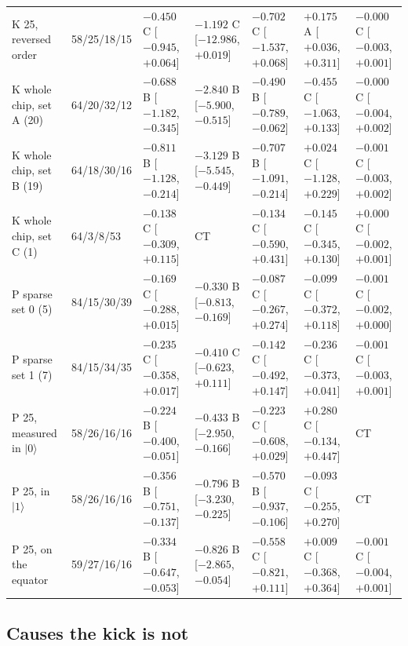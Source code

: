 \documentclass[reprint,amsmath,amssymb,aps,superscriptaddress,nofootinbib]{revtex4-2}
\begin{document}
\begin{table}[!tp]
\begin{tabular}{p{3.6cm}p{1.6cm}p{2.15cm}p{2.15cm}p{2.15cm}p{2.15cm}p{2.15cm}}
K 25, reversed order & 58/25/18/15 & $-0.450$ C [$-0.945$,$+0.064$] & $-1.192$ C [$-12.986$,$+0.019$] & $-0.702$ C [$-1.537$,$+0.068$] & $+0.175$ A [$+0.036$,$+0.311$] & $-0.000$ C [$-0.003$,$+0.001$] \\
K whole chip, set A (20) & 64/20/32/12 & $-0.688$ B [$-1.182$,$-0.345$] & $-2.840$ B [$-5.900$,$-0.515$] & $-0.490$ B [$-0.789$,$-0.062$] & $-0.455$ C [$-1.063$,$+0.133$] & $-0.000$ C [$-0.004$,$+0.002$] \\
K whole chip, set B (19) & 64/18/30/16 & $-0.811$ B [$-1.128$,$-0.214$] & $-3.129$ B [$-5.545$,$-0.449$] & $-0.707$ B [$-1.091$,$-0.214$] & $+0.024$ C [$-1.128$,$+0.229$] & $-0.001$ C [$-0.003$,$+0.002$] \\
K whole chip, set C (1) & 64/3/8/53 & $-0.138$ C [$-0.309$,$+0.115$] & CT & $-0.134$ C [$-0.590$,$+0.431$] & $-0.145$ C [$-0.345$,$+0.130$] & $+0.000$ C [$-0.002$,$+0.001$] \\
P sparse set 0 (5) & 84/15/30/39 & $-0.169$ C [$-0.288$,$+0.015$] & $-0.330$ B [$-0.813$,$-0.169$] & $-0.087$ C [$-0.267$,$+0.274$] & $-0.099$ C [$-0.372$,$+0.118$] & $-0.001$ C [$-0.002$,$+0.000$] \\
P sparse set 1 (7) & 84/15/34/35 & $-0.235$ C [$-0.358$,$+0.017$] & $-0.410$ C [$-0.623$,$+0.111$] & $-0.142$ C [$-0.492$,$+0.147$] & $-0.236$ C [$-0.373$,$+0.041$] & $-0.001$ C [$-0.003$,$+0.001$] \\
P 25, measured in $|0\rangle$ & 58/26/16/16 & $-0.224$ B [$-0.400$,$-0.051$] & $-0.433$ B [$-2.950$,$-0.166$] & $-0.223$ C [$-0.608$,$+0.029$] & $+0.280$ C [$-0.134$,$+0.447$] & CT \\
P 25, in $|1\rangle$ & 58/26/16/16 & $-0.356$ B [$-0.751$,$-0.137$] & $-0.796$ B [$-3.230$,$-0.225$] & $-0.570$ B [$-0.937$,$-0.106$] & $-0.093$ C [$-0.255$,$+0.270$] & CT \\
P 25, on the equator & 59/27/16/16 & $-0.334$ B [$-0.647$,$-0.053$] & $-0.826$ B [$-2.865$,$-0.054$] & $-0.558$ C [$-0.821$,$+0.111$] & $+0.009$ C [$-0.368$,$+0.364$] & $-0.001$ C [$-0.004$,$+0.001$] \\
\hline\hline
\end{tabular}
\end{table}

\subsection{Causes the kick is not}\label{sec:causes}
\end{document}
